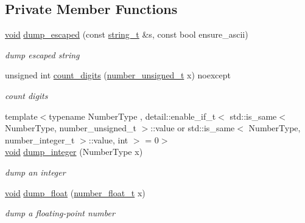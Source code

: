 \subsection*{Private Member Functions}
\begin{DoxyCompactItemize}
\item 
\hyperlink{namespacenlohmann_1_1detail_a59fca69799f6b9e366710cb9043aa77d}{void} \hyperlink{classnlohmann_1_1detail_1_1serializer_ac1f8d1165b44149bd8be397dce68ea05}{dump\+\_\+escaped} (const \hyperlink{classnlohmann_1_1detail_1_1serializer_ad08aa54fac1dd0a453320c54137d45ba}{string\+\_\+t} \&s, const bool ensure\+\_\+ascii)
\begin{DoxyCompactList}\small\item\em dump escaped string \end{DoxyCompactList}\item 
unsigned int \hyperlink{classnlohmann_1_1detail_1_1serializer_a10692e98ea1f5a64de1d0b8e0e724b99}{count\+\_\+digits} (\hyperlink{classnlohmann_1_1detail_1_1serializer_a16c7b7a726a38ff0c06dce7ba7968391}{number\+\_\+unsigned\+\_\+t} x) noexcept
\begin{DoxyCompactList}\small\item\em count digits \end{DoxyCompactList}\item 
{\footnotesize template$<$typename Number\+Type , detail\+::enable\+\_\+if\+\_\+t$<$ std\+::is\+\_\+same$<$ Number\+Type, number\+\_\+unsigned\+\_\+t $>$\+::value or std\+::is\+\_\+same$<$ Number\+Type, number\+\_\+integer\+\_\+t $>$\+::value, int $>$  = 0$>$ }\\\hyperlink{namespacenlohmann_1_1detail_a59fca69799f6b9e366710cb9043aa77d}{void} \hyperlink{classnlohmann_1_1detail_1_1serializer_a944f6dea8dbe2961da145d2f62fa2c2f}{dump\+\_\+integer} (Number\+Type x)
\begin{DoxyCompactList}\small\item\em dump an integer \end{DoxyCompactList}\item 
\hyperlink{namespacenlohmann_1_1detail_a59fca69799f6b9e366710cb9043aa77d}{void} \hyperlink{classnlohmann_1_1detail_1_1serializer_a6d652a3bfa581cf1cd7790d6d11ea52f}{dump\+\_\+float} (\hyperlink{classnlohmann_1_1detail_1_1serializer_a460c6794fbabbb2ae83380e987a6c030}{number\+\_\+float\+\_\+t} x)
\begin{DoxyCompactList}\small\item\em dump a floating-\/point number \end{DoxyCompactList}\item 

\end{DoxyCompactItemize}

